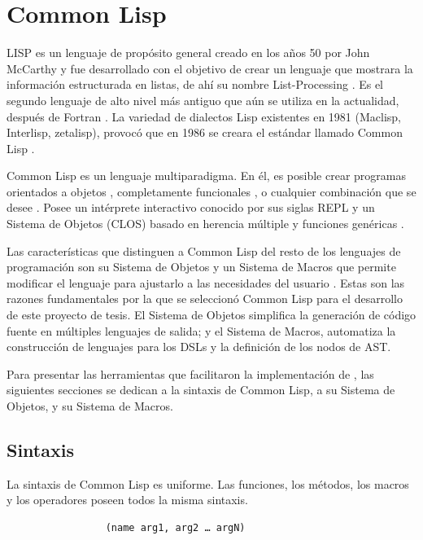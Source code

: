\section{Common Lisp}

LISP es un lenguaje de propósito general creado en los años 50 por John McCarthy y fue desarrollado con el objetivo de crear un lenguaje que mostrara la información estructurada en listas, de ahí su nombre List-Processing \cite{ansi-common-lisp}.  Es el segundo lenguaje de alto nivel más antiguo que aún se utiliza en la actualidad, después de Fortran \cite{gentle-introduction-to-common-lisp}. La variedad de dialectos Lisp existentes en 1981 (Maclisp, Interlisp, zetalisp), provocó que en 1986 se creara el estándar llamado Common Lisp \cite{Land-of-Lisp}.


Common Lisp es un lenguaje multiparadigma. En él, es posible crear programas orientados a objetos \cite{sonya}, completamente funcionales \cite{onlisp}, o cualquier combinación que se desee \cite{Land-of-Lisp}.  Posee un intérprete interactivo conocido por sus siglas REPL \cite{practical-common-lisp} y un Sistema de Objetos (CLOS) basado en herencia múltiple y funciones genéricas \cite{sonya}.

Las características que distinguen a Common Lisp del resto de los lenguajes de programación son su Sistema de Objetos y un Sistema de Macros que permite modificar el lenguaje para ajustarlo a las necesidades del usuario \cite{practical-common-lisp} \cite{sonya}. Estas son las razones fundamentales por la que se seleccionó Common Lisp para el desarrollo de este proyecto de tesis. El Sistema de Objetos simplifica la generación de código fuente en múltiples lenguajes de salida; y el Sistema de Macros, automatiza la construcción de lenguajes para los DSLs y la definición de los nodos de AST.

Para presentar las herramientas que facilitaron la implementación de \gagm, las siguientes secciones se dedican a la sintaxis de Common Lisp, a su Sistema de Objetos, y su Sistema de Macros.

\subsection{Sintaxis}

La sintaxis de Common Lisp es uniforme. Las funciones, los métodos, los macros y los operadores poseen todos la misma sintaxis.
\begin{verbatim}
                 (name arg1, arg2 … argN)
\end{verbatim}


